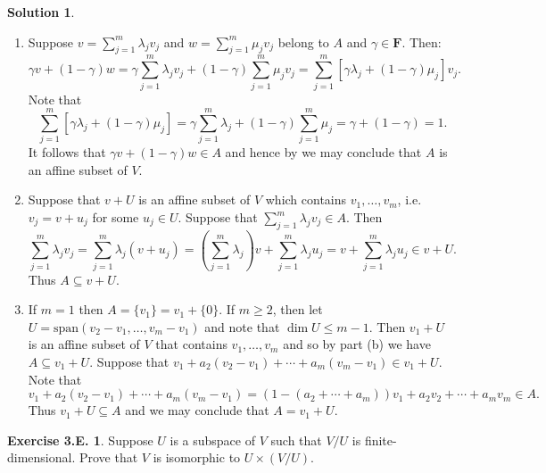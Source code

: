 \documentclass[12pt]{article}
\theoremstyle{definition}
\theoremstyle{exercise}
\newtheorem{exercise}{Exercise 3.E.}
\theoremstyle{solution}
\newtheorem*{solution}{Solution}
\newcommand{\Span}{\text{span}}
\newcommand{\F}{\mathbf{F}}
\begin{document}
\begin{solution}
    \begin{enumerate}
        \item Suppose \( v = \sum_{j=1}^m \lambda_j v_j \) and \( w = \sum_{j=1}^m \mu_j v_j \) belong to \( A \) and \( \gamma \in \F \). Then:
        \[
            \gamma v + (1 - \gamma) w = \gamma \sum_{j=1}^m \lambda_j v_j + (1 - \gamma) \sum_{j=1}^m \mu_j v_j = \sum_{j=1}^m [\gamma \lambda_j + (1 - \gamma) \mu_j] v_j.
        \]
        Note that
        \[
            \sum_{j=1}^m [\gamma \lambda_j + (1 - \gamma) \mu_j] = \gamma \sum_{j=1}^m \lambda_j + (1 - \gamma) \sum_{j=1}^m \mu_j = \gamma + (1 - \gamma) = 1.
        \]
        It follows that \( \gamma v + (1 - \gamma) w \in A \) and hence by  we may conclude that \( A \) is an affine subset of \( V \).

        \item Suppose that \( v + U \) is an affine subset of \( V \) which contains \( v_1, \ldots, v_m \), i.e.\ \( v_j = v + u_j \) for some \( u_j \in U \). Suppose that \( \sum_{j=1}^m \lambda_j v_j \in A \). Then
        \[
            \sum_{j=1}^m \lambda_j v_j = \sum_{j=1}^m \lambda_j (v + u_j) = \left(\sum_{j=1}^m \lambda_j\right) v + \sum_{j=1}^m \lambda_j u_j = v + \sum_{j=1}^m \lambda_j u_j \in v + U.
        \]
        Thus \( A \subseteq v + U \).

        \item If \( m = 1 \) then \( A = \{ v_1 \} = v_1 + \{ 0 \} \). If \( m \geq 2 \), then let \( U = \Span(v_2 - v_1, \ldots, v_m - v_1) \) and note that \( \dim U \leq m - 1 \). Then \( v_1 + U \) is an affine subset of \( V \) that contains \( v_1, \ldots, v_m \) and so by part (b) we have \( A \subseteq v_1 + U \). Suppose that \( v_1 + a_2(v_2 - v_1) + \cdots + a_m(v_m - v_1) \in v_1 + U \). Note that
        \[
            v_1 + a_2(v_2 - v_1) + \cdots + a_m(v_m - v_1) = (1 - (a_2 + \cdots + a_m))v_1 + a_2 v_2 + \cdots + a_m v_m \in A.
        \]
        Thus \( v_1 + U \subseteq A \) and we may conclude that \( A = v_1 + U \).
    \end{enumerate}
\end{solution}

\begin{exercise}
\label{ex:12}
    Suppose \( U \) is a subspace of \( V \) such that \( V/U \) is finite-dimensional. Prove that \( V \) is isomorphic to \( U \times (V/U) \).
\end{exercise}
\end{document}
